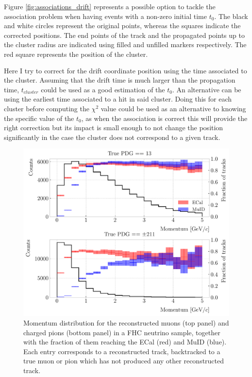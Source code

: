 Figure \ref{fig:associations_drift} represents a possible option to tackle the association problem when having events with a non-zero initial time $t_{0}$. The black and white circles represent the original points, whereas the squares indicate the corrected positions. The end points of the track and the propagated points up to the cluster radius are indicated using filled and unfilled markers respectively. The red square represents the position of the cluster.

Here I try to correct for the drift coordinate position using the time associated to the cluster. Assuming that the drift time is much larger than the propagation time, $t_{cluster}$ could be used as a good estimation of the $t_{0}$. An alternative can be using the earliest time associated to a hit in said cluster. Doing this for each cluster before computing the $\chi^{2}$ value could be used as an alternative to knowing the specific value of the $t_{0}$, as when the association is correct this will provide the right correction but its impact is small enough to not change the position significantly in the case the cluster does not correspond to a given track.

\begin{figure}[t]
	\centering
	\includegraphics[width=.80\linewidth]{Images/GArSoft_PID/BDT/fraction_vs_preco_no_duplicates.pdf}
	\caption{Momentum distribution for the reconstructed muons (top panel) and charged pions (bottom panel) in a FHC neutrino sample, together with the fraction of them reaching the ECal (red) and MuID (blue). Each entry corresponds to a reconstructed track, backtracked to a true muon or pion which has not produced any other reconstructed track.}
	\label{fig:fraction_particles_ecal_muid}
\end{figure}

